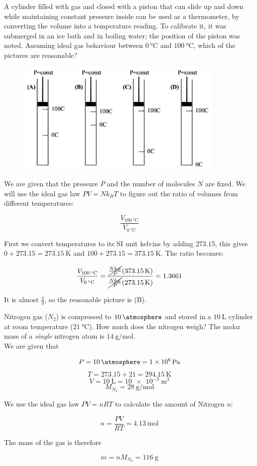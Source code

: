 \begin{texample}
	A cylinder filled with gas and closed with a piston that can slide up and down while maintaining constant pressure inside can be used as a thermometer, by converting the volume into a temperature reading. To calibrate it, it was submerged in an ice bath and in boiling water; the position of the piston was 
	noted. Assuming ideal gas behaviour between $\SI{0}{\celsius}$ and $\SI{100}{\celsius}$, which of the pictures are reasonable?
	
	\begin{figure}[H]
		\centering
		\includegraphics[width=100mm]{18.png}
	\end{figure}
	
	We are given that the pressure $P$ and the number of molecules $N$ are fixed. We will use the ideal gas law $PV=Nk_B T$ to figure out the ratio of volumes from different temperatures:
	
	$$\frac{V_{\SI{100}{\celsius}}}{V_{\SI{0}{\celsius}}}$$
	
	First we convert temperatures to its SI unit kelvins by adding $273.15$, this gives $0+273.15=\SI{273.15}{\kelvin}$ and $100+273.15=\SI{373.15}{\kelvin}$. The ratio becomes:
	
	$$\frac{V_{\SI{100}{\celsius}}}{V_{\SI{0}{\celsius}}}=\frac{\cancel{\frac{Nk_B}{P}} (\SI{373.15}{\kelvin})}{\cancel{\frac{Nk_B}{P}} (\SI{273.15}{\kelvin})}=1.3661$$
	
	It is almost $\frac43$, so the reasonable picture is (B).
\end{texample}

\begin{texample}
	Nitrogen gas ($N_2$) is compressed to $\SI{10}{\atmosphere}$ and stored in a $\SI{10}{\liter}$ cylinder at room temperature ($\SI{21}{\celsius}$). How much does the nitrogen weigh? The molar mass of a \textit{single} nitrogen atom is $\SI{14}{\gram\per\mole}$. \\
	
	We are given that
	
	$$P=\SI{10}{\atmosphere}=\SI{1e6}{\pascal}$$
	$$T=273.15+21=\SI{294.15}{\kelvin}$$
	$$V=\SI{10}{\liter}=\SI{10e-3}{\cubic\meter}$$
	$$M_{N_2}=\SI{28}{\gram\per\mole}$$
	
	We use the ideal gas law $PV=nRT$ to calculate the amount of Nitrogen $n$:
	
	$$n=\frac{PV}{RT}=\SI{4.13}{\mole}$$
	
	The mass of the gas is therefore
	
	$$m=nM_{N_2}=\SI{116}{\gram}$$
\end{texample}

